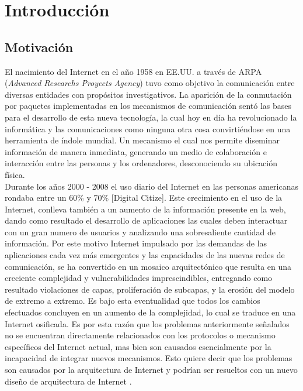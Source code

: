 \documentclass[12pt]{ociamthesis}  %
\begin{document}
\begin{romanpages}          %
\tableofcontents            %
\listoffigures              %
\end{romanpages}            %

\chapter{Introducción}
\section{Motivación}

El nacimiento del Internet en el año 1958 en EE.UU. a través de ARPA (\textit{Advanced Researchs Proyects Agency}) tuvo como objetivo la comunicación entre diversas entidades con propósitos investigativos. La aparición de la conmutación por paquetes implementadas en los mecanismos de comunicación sentó las bases para el desarrollo de esta nueva tecnología, la cual hoy en día ha revolucionado la informática y las comunicaciones como ninguna otra cosa convirtiéndose en una herramienta de índole mundial. Un mecanismo el cual nos permite diseminar información de manera inmediata, generando un medio de colaboración e interacción entre las personas y los ordenadores, desconociendo su ubicación física.\\

Durante los años 2000 - 2008 el uso diario del Internet en las personas americanas rondaba entre un 60\% y 70\% [Digital Citize]. Este crecimiento en el uso de la Internet, conlleva también a un aumento de la información presente en la web, dando como resultado el desarrollo de aplicaciones las cuales deben interactuar con un gran numero de usuarios y analizando una sobresaliente cantidad de información. Por este motivo Internet impulsado por las demandas de las aplicaciones cada vez más emergentes y las capacidades de las nuevas redes de comunicación, se ha convertido en un mosaico arquitectónico que resulta en una creciente complejidad y vulnerabilidades imprescindibles, entregando como resultado violaciones de capas, proliferación de subcapas, y la erosión del modelo de extremo a extremo. Es bajo esta eventualidad que todos los cambios efectuados concluyen en un aumento de la complejidad, lo cual se traduce en una Internet osificada. Es por esta razón que los problemas anteriormente señalados no se encuentran directamente relacionados con los protocolos o mecanismo específicos del Internet actual, mas bien son causados esencialmente por la incapacidad de integrar nuevos mecanismos. Esto quiere decir que los problemas son causados por la arquitectura de Internet y podrían ser resueltos con un nuevo diseño de arquitectura de Internet \cite{muller2009future}.\\
\end{document}
